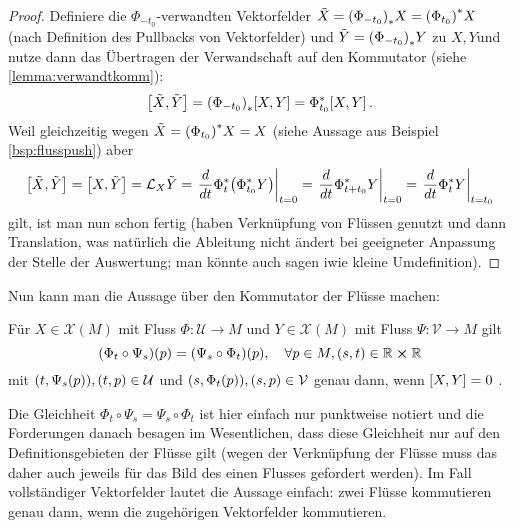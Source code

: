 \documentclass[../H_Analysis_main.tex]{subfiles}
\begin{document}
\begin{proof}
Definiere die $\Phi_{- t_0}$-verwandten Vektorfelder $\tilde{X} = \qty(\Phi_{- t_0})_* X = \qty(\Phi_{t_0})^* X$ (nach Definition des Pullbacks von Vektorfelder) und $\tilde{Y} = \qty(\Phi_{- t_0})_* Y$  zu $X, Y$und nutze dann das Übertragen der Verwandschaft auf den Kommutator (siehe \ref{lemma:verwandtkomm}):
\begin{equation*}
\qty[\tilde{X}, \tilde{Y}] = \qty(\Phi_{- t_0})_* \qty[X, Y] = \Phi^*_{t_0} \qty[X, Y] \, .
\end{equation*}
Weil gleichzeitig wegen $\tilde{X} = \qty(\Phi_{t_0})^* X = X$ (siehe Aussage aus Beispiel \ref{bsp:flusspush}) aber
\begin{equation*}
\qty[\tilde{X}, \tilde{Y}] = \qty[X, \tilde{Y}] = \mathcal{L}_X \tilde{Y} = \eval{\dv{t} \Phi^*_t \qty(\Phi^*_{t_0} Y)}_{t = 0} = \eval{\dv{t} \Phi^*_{t + t_0} Y}_{t = 0} = \eval{\dv{t} \Phi^*_t Y}_{t = t_0}
\end{equation*}
gilt, ist man nun schon fertig (haben Verknüpfung von Flüssen genutzt und dann Translation, was natürlich die Ableitung nicht ändert bei geeigneter Anpassung der Stelle der Auswertung; man könnte auch sagen iwie kleine Umdefinition).
\end{proof}


Nun kann man die Aussage über den Kommutator der Flüsse machen:
\begin{satz}
Für $X \in \mathcal{X}(M)$ mit Fluss $\Phi: \mathcal{U} \rightarrow M$ und $Y \in \mathcal{X}(M)$ mit Fluss $\Psi: \mathcal{V} \rightarrow M$ gilt
\begin{equation}
\qty(\Phi_t \circ \Psi_s)(p) = \qty(\Psi_s \circ \Phi_t)(p), \quad \forall p \in M, (s, t) \in \mathbb{R} \cross \mathbb{R}
\end{equation}
mit $\qty(t, \Psi_s(p)), (t, p) \in \mathcal{U}$ und $\qty(s, \Phi_t(p)), (s, p) \in \mathcal{V}$ genau dann, wenn $\qty[X, Y] = 0$ .
\end{satz}
Die Gleichheit $\Phi_t \circ \Psi_s = \Psi_s \circ \Phi_t$ ist hier einfach nur punktweise notiert und die Forderungen danach besagen im Wesentlichen, dass diese Gleichheit nur auf den Definitionsgebieten der Flüsse gilt (wegen der Verknüpfung der Flüsse muss das daher auch jeweils für das Bild des einen Flusses gefordert werden). Im Fall vollständiger Vektorfelder lautet die Aussage einfach: zwei Flüsse kommutieren genau dann, wenn die zugehörigen Vektorfelder kommutieren.
\end{document}

